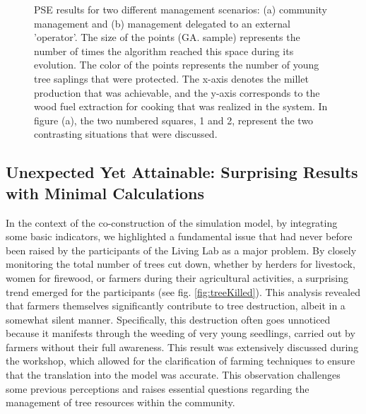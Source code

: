 \documentclass{article}
\begin{document}
\begin{figure}[h]
        \caption{PSE results for two different management scenarios: (a) community management and (b) management delegated to an external 'operator'. The size of the points (GA. sample) represents the number of times the algorithm reached this space during its evolution. The color of the points represents the number of young tree saplings that were protected. The x-axis denotes the millet production that was achievable, and the y-axis corresponds to the wood fuel extraction for cooking that was realized in the system. In figure (a), the two numbered squares, 1 and 2, represent the two contrasting situations that were discussed.}\label{fig:PSE}
    \end{figure}
    \FloatBarrier

 \subsection{Unexpected Yet Attainable: Surprising Results with Minimal Calculations}

 In the context of the co-construction of the simulation model, by integrating some basic indicators, we highlighted a fundamental issue that had never before been raised by the participants of the Living Lab as a major problem. By closely monitoring the total number of trees cut down, whether by herders for livestock, women for firewood, or farmers during their agricultural activities, a surprising trend emerged for the participants (see fig. \ref{fig:treeKilled}). This analysis revealed that farmers themselves significantly contribute to tree destruction, albeit in a somewhat silent manner. Specifically, this destruction often goes unnoticed because it manifests through the weeding of very young seedlings, carried out by farmers without their full awareness. This result was extensively discussed during the workshop, which allowed for the clarification of farming techniques to ensure that the translation into the model was accurate. This observation challenges some previous perceptions and raises essential questions regarding the management of tree resources within the community.
\end{document}
